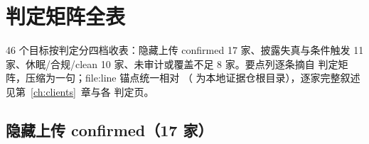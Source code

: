 \chapter{判定矩阵全表}
\label{app:matrix}

46 个目标按判定分四档收表：隐藏上传 confirmed 17 家、披露失真与条件触发 11 家、休眠/合规/clean 10 家、未审计或覆盖不足 8 家。要点列逐条摘自  判定矩阵，压缩为一句；file:line 锚点统一相对 （ 为本地证据仓根目录），逐家完整叙述见第~\ref{ch:clients}~章与各  判定页。

\section{隐藏上传 confirmed（17 家）}

